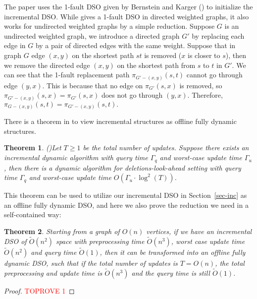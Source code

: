 \documentclass[11pt]{article}
\theoremstyle{plain}
\newtheorem{theorem}{Theorem}[section]
\theoremstyle{definition}
\begin{document}
The paper uses the 1-fault DSO given by Bernstein and Karger (\cite{2009A}) to initialize the incremental DSO. While \cite{2009A} gives a 1-fault DSO in directed weighted graphs, it also works for undirected weighted graphs by a simple reduction. Suppose $G$ is an undirected weighted graph, we introduce a directed graph $G'$ by replacing each edge in $G$ by a pair of directed edges with the same weight. Suppose that in graph $G$ edge $(x,y)$ on the shortest path $st$ is removed ($x$ is closer to $s$), then we remove the directed edge $(x,y)$ on the shortest path from $s$ to $t$ in $G'.$ We can see that the 1-fault replacement path $\pi_{G'-(x,y)}(s,t)$ cannot go through edge $(y,x).$ This is because that no edge on $\pi_{G'}(s,x)$ is removed, so $\pi_{G'-(x,y)}(s,x)=\pi_{G'}(s,x)$ does not go through $(y,x).$ Therefore, $\pi_{G-(x,y)}(s,t)=\pi_{G'-(x,y)}(s,t).$ 





There is a theorem in \cite{peng2023fully} to view incremental structures as offline fully dynamic structures.

\begin{theorem} (\cite{peng2023fully})\label{thm1-2}
Let $T \geq 1$ be the total number of updates. Suppose there exists an incremental dynamic algorithm with query time $\Gamma_q$ and worst-case update time $\Gamma_u$, then there is a dynamic algorithm for deletions-look-ahead setting with query time $\Gamma_q$ and worst-case update time $O(\Gamma_u \cdot \log^2(T))$.
\end{theorem}

This theorem can be used to utilize our incremental DSO in Section~\ref{sec-inc} as an offline fully dynamic DSO, and here we also prove the reduction we need in a self-contained way:

\begin{theorem}\label{thm:offline}
    Starting from a graph of $O(n)$ vertices, if we have an incremental DSO of $\tilde{O}(n^2)$ space with preprocessing time $\tilde{O}(n^3)$, worst case update time $\tilde{O}(n^2)$ and query time $\tilde{O}(1)$, then it can be transformed into an offline fully dynamic DSO, such that if the total number of updates is $T=O(n)$, the total preprocessing and update time is $\tilde{O}(n^3)$ and the query time is still $\tilde{O}(1)$.
\end{theorem}
\begin{proof}\textcolor{red}{TOPROVE 1}\end{proof}
\end{document}
